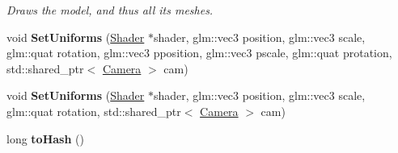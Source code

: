 \begin{DoxyCompactItemize}
\begin{DoxyCompactList}\small\item\em Draws the model, and thus all its meshes. \end{DoxyCompactList}\item 
void {\bfseries Set\+Uniforms} (\hyperlink{class_shader}{Shader} $\ast$shader, glm\+::vec3 position, glm\+::vec3 scale, glm\+::quat rotation, glm\+::vec3 pposition, glm\+::vec3 pscale, glm\+::quat protation, std\+::shared\+\_\+ptr$<$ \hyperlink{class_camera}{Camera} $>$ cam)\hypertarget{class_model_a158e521766a8025af10164d49a748d65}{}\label{class_model_a158e521766a8025af10164d49a748d65}

\item 
void {\bfseries Set\+Uniforms} (\hyperlink{class_shader}{Shader} $\ast$shader, glm\+::vec3 position, glm\+::vec3 scale, glm\+::quat rotation, std\+::shared\+\_\+ptr$<$ \hyperlink{class_camera}{Camera} $>$ cam)\hypertarget{class_model_a747213788550bd06cd4d24f0bd8347f4}{}\label{class_model_a747213788550bd06cd4d24f0bd8347f4}

\item 
long {\bfseries to\+Hash} ()\hypertarget{class_model_a801e5c752f03761b5eb46435f6fc8bd6}{}\label{class_model_a801e5c752f03761b5eb46435f6fc8bd6}

\end{DoxyCompactItemize}
